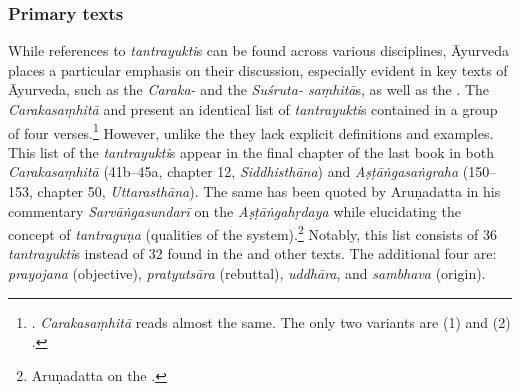 \subsubsection{Primary texts}
While references to \emph{tantrayukti}s can be found across various disciplines, Āyurveda places a particular emphasis on their discussion, especially evident in key texts of Āyurveda, such as the \emph{Caraka-} and the \emph{Suśruta- saṃhitā}s, as well as the \AS. The \emph{Carakasaṃhitā} and \AS present an identical list of \emph{tantrayukti}s contained in a group of four verses.\footnote{\label{CaAsT}
	\begin{verse}
	\end{verse}
	\AS {}. \emph{Carakasaṃhitā}  reads almost the same. The only two variants are (1)  and (2) .
	} 
However, unlike the \SS they lack explicit definitions and examples. This list of the \emph{tantrayukti}s appear in the final chapter of the last book in both \emph{Carakasaṃhitā} (41b--45a, chapter 12, \emph{Siddhisthāna}) and \emph{Aṣṭāṅgasaṅgraha} (150--153, chapter 50, \emph{Uttarasthāna}). The same has been quoted by Aruṇadatta in his commentary \emph{Sarvāṅgasundarī} on the \emph{Aṣṭāṅgahṛdaya} while elucidating the concept of \emph{tantraguṇa} (qualities of the system).\footnote{Aruṇadatta on the \AHS {}.} 
Notably, this list consists of 36 \emph{tantrayukti}s instead of 32 found in the \SS and other texts. The additional four are: \emph{prayojana} (objective), \emph{pratyutsāra} (rebuttal), \emph{uddhāra}, and \emph{sambhava} (origin). 

